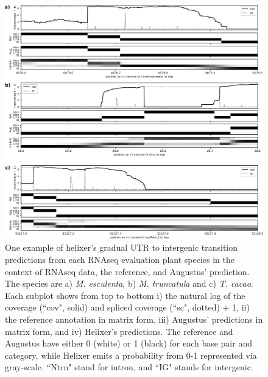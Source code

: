\documentclass{article}
\begin{document}
\begin{figure}[!h]
\renewcommand\thefigure{S9}
\centerline{\includegraphics[width=17.8cm]{images/cov_examples/cov_example_UTRs_plants}}
\caption{
One example of helixer's gradual UTR to intergenic transition predictions 
from each RNAseq evaluation plant species in the context of RNAseq data, the reference,
and Augustus' prediction. The species are
a) {\it M. esculenta}, b) {\it M. truncatula} and c) {\it T. cacao}. Each subplot shows from top to
bottom i) the natural log of the coverage (``cov", solid) and spliced coverage
(``sc", dotted) + 1, ii) the reference annotation in matrix form, iii)
Augustus' predictions in matrix form, and iv) Helixer's predictions. The reference
and Augustus have either 0 (white) or 1 (black) for each base pair and category, while
Helixer emits a probability from 0-1 represented via gray-scale. ``Ntrn" stand
for intron, and ``IG" stands for intergenic.
}
\end{figure}
\end{document}
